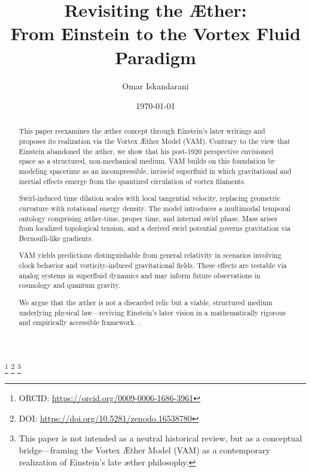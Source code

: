\documentclass[preprint,titlepage]{revtex4-2}
\begin{document}
    \title{Revisiting the Æther:\\ From Einstein to the Vortex Fluid Paradigm}

    \author{Omar Iskandarani}
    \thanks{ORCID: \url{https://orcid.org/0009-0006-1686-3961}}
    \thanks{DOI: \url{https://doi.org/10.5281/zenodo.16538780}}
    \thanks{This paper is not intended as a neutral historical review, but as a conceptual bridge—framing the Vortex Æther Model (VAM) as a contemporary realization of Einstein’s late æther philosophy.}

    \date{\today}


    \vspace{1em}

    \begin{abstract}
        \vspace{0.5em}
            This paper reexamines the æther concept through Einstein’s later writings and proposes its realization via the Vortex Æther Model (VAM). Contrary to the view that Einstein abandoned the æther, we show that his post-1920 perspective envisioned space as a structured, non-mechanical medium. VAM builds on this foundation by modeling spacetime as an incompressible, inviscid superfluid in which gravitational and inertial effects emerge from the quantized circulation of vortex filaments.

            Swirl-induced time dilation scales with local tangential velocity, replacing geometric curvature with rotational energy density. The model introduces a multimodal temporal ontology comprising æther-time, proper time, and internal swirl phase. Mass arises from localized topological tension, and a derived swirl potential governs gravitation via Bernoulli-like gradients.

            VAM yields predictions distinguishable from general relativity in scenarios involving clock behavior and vorticity-induced gravitational fields. These effects are testable via analog systems in superfluid dynamics and may inform future observations in cosmology and quantum gravity.

            We argue that the æther is not a discarded relic but a viable, structured medium underlying physical law—reviving Einstein’s later vision in a mathematically rigorous and empirically accessible framework.
        \vspace{0.5em}.
    \end{abstract}
\end{document}
